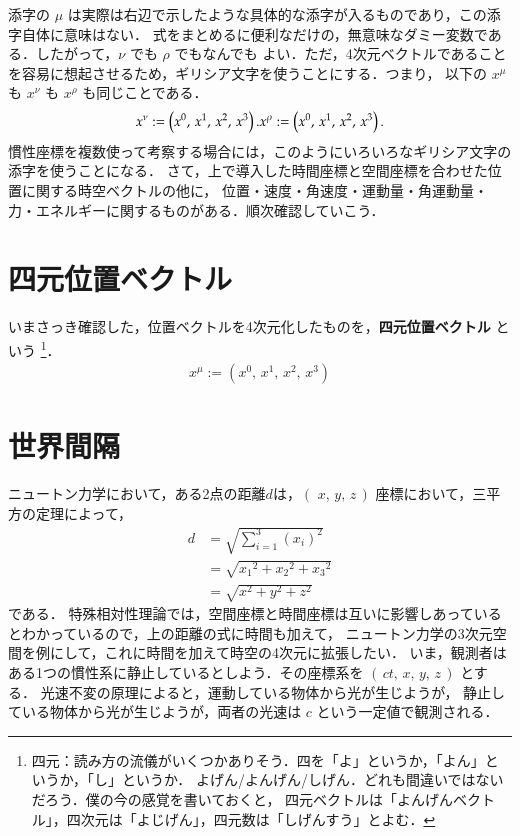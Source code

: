         添字の $\mu$ は実際は右辺で示したような具体的な添字が入るものであり，この添字自体に意味はない．
        式をまとめるに便利なだけの，無意味なダミー変数である．したがって，$\nu$ でも $\rho$ でもなんでも
        よい．ただ，4次元ベクトルであることを容易に想起させるため，ギリシア文字を使うことにする．つまり，
        以下の $x^{\mu}$ も $x^{\nu}$ も $x^{\rho}$ も同じことである．
        \[
            x^{\nu}  := \left( x^{0}, \, x^{1}, \, x^{2}, \, x^{3} \right). \\
            x^{\rho} := \left( x^{0}, \, x^{1}, \, x^{2}, \, x^{3} \right).
        \]
        慣性座標を複数使って考察する場合には，このようにいろいろなギリシア文字の添字を使うことになる．
        さて，上で導入した時間座標と空間座標を合わせた位置に関する時空ベクトルの他に，
        位置・速度・角速度・運動量・角運動量・力・エネルギーに関するものがある．順次確認していこう．

\section{四元位置ベクトル}
    いまさっき確認した，位置ベクトルを4次元化したものを，\textbf{四元位置ベクトル} という
        \footnote{
            四元：読み方の流儀がいくつかありそう．四を「よ」というか，「よん」というか，「し」というか．
            よげん/よんげん/しげん．どれも間違いではないだろう．僕の今の感覚を書いておくと，
            四元ベクトルは「よんげんベクトル」，四次元は「よじげん」，四元数は「しげんすう」とよむ．
        }．
    \begin{align}
        x^{\mu} := \left( x^{0}, \, x^{1}, \, x^{2}, \, x^{3} \right)
    \end{align}

\section{世界間隔}
    ニュートン力学において，ある2点の距離$d$は，$(\,\,x,\,y,\,z\,)$ 座標において，三平方の定理によって，
        \begin{align*}
            d &= \sqrt{\sum_{i=1}^{3} \left({x_{i}}\right)^{2}} \\
              &= \sqrt{{x_{1}}^{2} + {x_{2}}^{2} + {x_{3}}^{2}} \\
              &= \sqrt{{x}^{2} + {y}^{2} + {z}^{2}}
        \end{align*}
    である．
    特殊相対性理論では，空間座標と時間座標は互いに影響しあっているとわかっているので，上の距離の式に時間も加えて，
    ニュートン力学の3次元空間を例にして，これに時間を加えて時空の4次元に拡張したい．
    いま，観測者はある1つの慣性系に静止しているとしよう．その座標系を $(\,ct,\,x,\,y,\,z\,)$ とする．
    光速不変の原理によると，運動している物体から光が生じようが，
    静止している物体から光が生じようが，両者の光速は $c$ という一定値で観測される．

